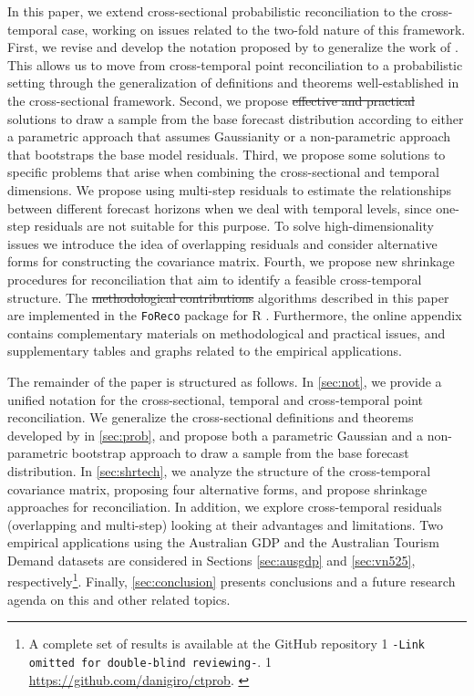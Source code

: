 \documentclass[review, 11pt]{elsarticle}
\newcommand{\blind}{1}
\theoremstyle{definition}
\newcommand{\githuburl}{\begingroup%
\if1\blind
{
\texttt{-Link omitted for double-blind reviewing-}.
}\fi
\if0\blind
{
\url{https://github.com/danigiro/ctprob}.
}\fi
\endgroup}
\begin{document}
In this paper, we extend cross-sectional probabilistic reconciliation to the cross-temporal case, working on issues related to the two-fold nature of this framework. First, we revise and develop the notation proposed by \cite{difonzo2023} to generalize the work of \cite{panagiotelis2023}. This allows us to move from cross-temporal point reconciliation to a probabilistic setting through the generalization of definitions and theorems well-established in the cross-sectional framework. Second, we propose {\color{red}\sout{effective and practical}} solutions to draw a sample from the base forecast distribution according to either a parametric approach that assumes Gaussianity or a non-parametric approach that bootstraps the base model residuals. Third, we propose some solutions to specific problems that arise when combining the cross-sectional and temporal dimensions. We propose using multi-step residuals to estimate the relationships between different forecast horizons when we deal with temporal levels, since one-step residuals are not suitable for this purpose. To solve high-dimensionality issues we introduce the idea of overlapping residuals and consider alternative forms for constructing the covariance matrix. Fourth, we propose new shrinkage procedures for reconciliation that aim to identify a feasible cross-temporal structure. The {\color{red}\sout{methodological contributions}} {\color{blue}algorithms} described in this paper are implemented in the \texttt{FoReco} package \citep{foreco2023} for R \citep{rcoreteam2022}. Furthermore, the online appendix contains complementary materials on methodological and practical issues, and supplementary tables and graphs related to the empirical applications.

The remainder of the paper is structured as follows. In \autoref{sec:not}, we provide a unified notation for the cross-sectional, temporal and cross-temporal point reconciliation. We generalize the cross-sectional definitions and theorems developed by \cite{panagiotelis2023} in \autoref{sec:prob}, and propose both a parametric Gaussian and a non-parametric bootstrap approach to draw a sample from the base forecast distribution. In \autoref{sec:shrtech}, we analyze the structure of the cross-temporal covariance matrix, proposing four alternative forms, and propose shrinkage approaches for reconciliation. In addition, we explore cross-temporal residuals (overlapping and multi-step) looking at their advantages and limitations. %
Two empirical applications using the Australian GDP and the Australian Tourism Demand datasets are considered in Sections \ref{sec:ausgdp} and \ref{sec:vn525}, respectively\footnote{A complete set of results is available at the GitHub repository \githuburl}. Finally, \autoref{sec:conclusion} presents conclusions and a future research agenda on this and other related topics.
\end{document}
